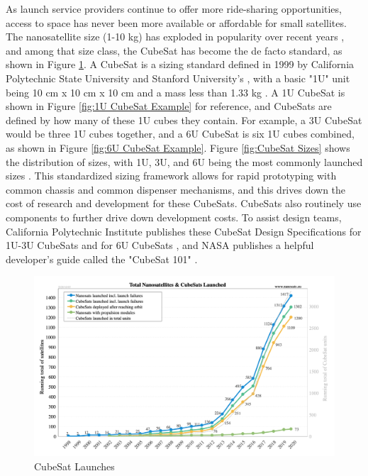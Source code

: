 As launch service providers continue to offer more ride-sharing opportunities, access to space has never been more available or affordable for small satellites. The nanosatellite size (1-10 kg) has exploded in popularity over recent years \citep{NanosatsEU}, and among that size class, the CubeSat has become the de facto standard, as shown in Figure \ref{fig:CubeSat Launches}. A CubeSat is a sizing standard defined in 1999 by California Polytechnic State University and Stanford University's , with a basic "1U" unit being 10 cm x 10 cm x 10 cm and a mass less than 1.33 kg \citep{DesignSpec}. A 1U CubeSat is shown in Figure \ref{fig:1U CubeSat Example} for reference, and CubeSats are defined by how many of these 1U cubes they contain. For example, a 3U CubeSat would be three 1U cubes together, and a 6U CubeSat is six 1U cubes combined, as shown in Figure \ref{fig:6U CubeSat Example}. Figure \ref{fig:CubeSat Sizes} shows the distribution of sizes, with 1U, 3U, and 6U being the most commonly launched sizes \citep{NanosatsEU}. This standardized sizing framework allows for rapid prototyping with common chassis and common dispenser mechanisms, and this drives down the cost of research and development for these CubeSats. CubeSats also routinely use  components to further drive down development costs. To assist design teams, California Polytechnic Institute publishes these CubeSat Design Specifications for 1U-3U CubeSats and for 6U CubeSats \citep{DesignSpec}, and NASA publishes a helpful developer's guide called the "CubeSat 101" \citep{NASA101}.

\begin{figure}
    \centering
    \includegraphics[width=\textwidth]{Thesis/Literature_Review/Lit Review Figures/total launched.png}
    \caption{CubeSat Launches}
    \label{fig:CubeSat Launches}
\end{figure}

